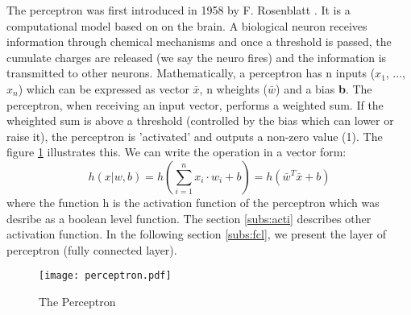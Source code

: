 The perceptron was first introduced in 1958 by F. Rosenblatt \cite{brain_perceptron_nodate}. It is a computational model based on on the brain. A biological neuron receives information through chemical mechanisms and once a threshold is passed, the cumulate charges are released (we say the neuro fires) and the information is transmitted to other neurons. \newline \newline
Mathematically, a perceptron has n inputs ($x_1$, ..., $x_n$) which can be expressed as vector \textbf{$\bar{x}$}, n wheights (\textbf{$\bar{w}$}) and a bias \textbf{b}. The perceptron, when receiving an input vector, performs a weighted sum. If the wheighted sum is above a threshold (controlled by the bias which can lower or raise it), the perceptron is 'activated' and outputs a non-zero value (1). The figure \ref{fig:perceptron} illustrates this. We can write the operation in a vector form:
$$ h(x| w, b) = h(\sum^{n}_{i=1} x_i \cdot w_i + b) = h ( \textbf{$\bar{w}$}^{T} \textbf{$\bar{x}$} + b) $$
where the function h is the activation function of the perceptron which was desribe as a boolean level function. The section \ref{subs:acti} describes other activation function. \newline \newline
In the following section \ref{subs:fcl}, we present the layer of perceptron (fully connected layer).
\begin{figure}
    \centering
    \texttt{[image: perceptron.pdf]}
    \caption{The Perceptron}
    \label{fig:perceptron}
\end{figure}
